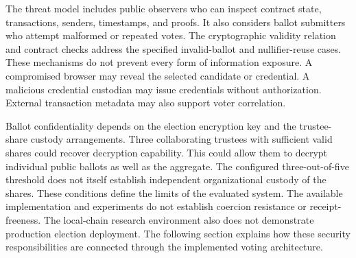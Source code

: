 
The threat model includes public observers who can inspect contract state,
transactions, senders, timestamps, and proofs. It also considers ballot
submitters who attempt malformed or repeated votes. The cryptographic
validity relation and contract checks address the specified invalid-ballot
and nullifier-reuse cases.
These mechanisms do not prevent every form of information exposure. A
compromised browser may reveal the selected candidate or credential. A
malicious credential custodian may issue credentials without authorization.
External transaction metadata may also support voter correlation.

Ballot confidentiality depends on the election encryption key and the
trustee-share custody arrangements. Three collaborating trustees with
sufficient valid shares could recover decryption capability. This could allow
them to decrypt individual public ballots as well as the aggregate. The
configured three-out-of-five threshold does not itself establish independent
organizational custody of the shares.
These conditions define the limits of the evaluated system. The available
implementation and experiments do not establish coercion resistance or
receipt-freeness. The local-chain research environment also does not
demonstrate production election deployment. The following section explains
how these security responsibilities are connected through the implemented
voting architecture.